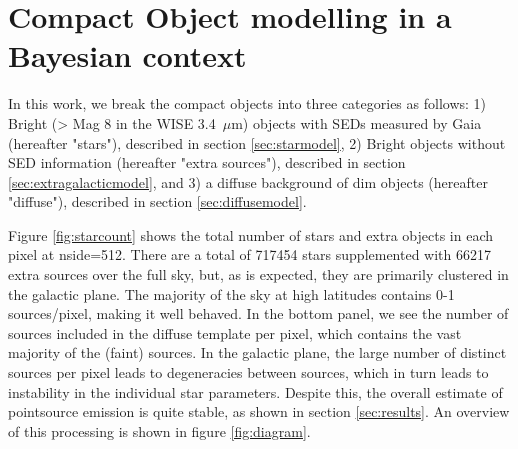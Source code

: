 \documentclass{aa}
\begin{document}
\section{Compact Object modelling in a Bayesian context}
\label{sec:models}


In this work, we break the compact objects into three categories as follows: 1) Bright (> Mag 8 in the WISE 3.4 $\,\mu$m) objects with SEDs measured by Gaia (hereafter "stars"), described in section \ref{sec:starmodel}, 2) Bright objects without SED information (hereafter "extra sources"), described in section \ref{sec:extragalacticmodel}, and 3) a diffuse background of dim objects (hereafter "diffuse"), described in section \ref{sec:diffusemodel}.

Figure \ref{fig:starcount} shows the total number of stars and extra objects in each pixel at nside=512. There are a total of 717454 stars supplemented with 66217 extra sources over the full sky, but, as is expected, they are primarily clustered in the galactic plane. The majority of the sky at high latitudes contains 0-1 sources/pixel, making it well behaved. In the bottom panel, we see the number of sources included in the diffuse template per pixel, which contains the vast majority of the (faint) sources. In the galactic plane, the large number of distinct sources per pixel leads to degeneracies between sources, which in turn leads to instability in the individual star parameters. Despite this, the overall estimate of pointsource emission is quite stable, as shown in section \ref{sec:results}. An overview of this processing is shown in figure \ref{fig:diagram}.
\end{document}
